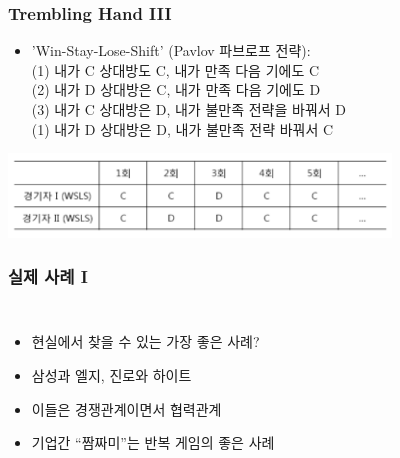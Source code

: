 \documentclass[final]{beamer}
\begin{document}
\begin{frame}\frametitle{Trembling Hand III}%
\begin{itemize}\large
\item 'Win-Stay-Lose-Shift' (Pavlov 파브로프 전략): \\ 
(1) 내가 C 상대방도 C, 내가 만족 다음 기에도 C \\
(2) 내가 D 상대방은 C, 내가 만족 다음 기에도 D \\
(3) 내가 C 상대방은 D, 내가 불만족 전략을 바꿔서 D \\
(1) 내가 D 상대방은 D, 내가 불만족 전략 바꿔서 C \\
\end{itemize}
\begin{center}
\includegraphics[width=4in]{pavlov01.png}
\end{center}
\end{frame}

\begin{frame}\frametitle{실제 사례 I}\vspace{2em}
\begin{columns}[c]
\column{16em}
\begin{itemize}
\item 현실에서 찾을 수 있는 가장 좋은 사례?
\item 삼성과 엘지, 진로와 하이트 
\item 이들은 경쟁관계이면서 협력관계 
\item 기업간 ``짬짜미''는 반복 게임의 좋은 사례 
\end{itemize}
\column{14em}
\end{columns}
\end{frame}
\end{document}
